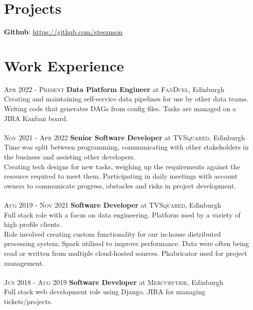 \documentclass[14pt, a4paper]{extarticle}
\begin{document}
\begin{multicols}{2}
\section{Projects}
\noindent\textbf{Github}: \url{https://github.com/steeznson}

\columnbreak
\section{Work Experience}
\noindent\textsc{Apr 2022 - Present} \textbf{Data Platform Engineer}
at \textsc{FanDuel}, Edinburgh\\
Creating and maintaining self-service data pipelines for use by other data teams. Writing code that generates DAGs from config files. Tasks are managed on a JIRA Kanban board.\\
\\
\noindent\textsc{Nov 2021 - Apr 2022} \textbf{Senior Software Developer}
at \textsc{TVSquared}, Edinburgh\\
Time was split between programming, communicating with other stakeholders in the business and assisting other developers.\\
Creating tech designs for new tasks, weighing up the requirements against the resource required to meet them. Participating in daily meetings with account owners to communicate progress, obstacles and risks in project development.\\
\\
\noindent\textsc{Aug 2019 - Nov 2021} \textbf{Software Developer}
at \textsc{TVSquared}, Edinburgh\\
Full stack role with a focus on data engineering. Platform used by a variety of high profile clients.\\
Role involved creating custom functionality for our in-house distributed processing system. Spark utilised to improve performance. Data were often being read or written from multiple cloud-hosted sources. Phabricator used for project management.\\
\\
\noindent\textsc{Jun 2018 - Aug 2019} \textbf{Software Developer}
at \textsc{Mercurytide}, Edinburgh\\
Full stack web development role using Django. JIRA for managing tickets/projects.\\
\end{multicols}
\end{document}
